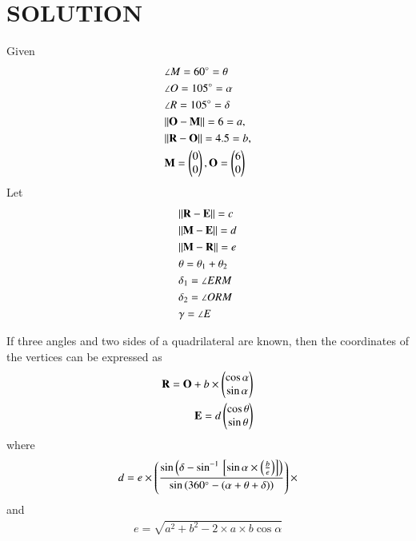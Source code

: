 \documentclass[journal,12pt,twocolumn]{IEEEtran}
\begin{document}
\section{SOLUTION}
Given
    \begin{align}
    &\angle M= 60\degree=\theta \label{eq1}
    \\
    &\angle O= 105\degree=\alpha
    \\
    &\angle R= 105\degree=\delta \label{eq2}
    \\
    &\lVert\mathbf{O}-\mathbf{M}\rVert =6=a, \label{eq3}
    \\
    &\lVert\mathbf{R}-\mathbf{O}\rVert =4.5=b,\label{eq4}
    \\
    &\mathbf{M}=\begin{pmatrix}0\\0\end{pmatrix}, \mathbf{O}=\begin{pmatrix}6\\0\end{pmatrix}
    \end{align}
      Let
\begin{align}
 &\lVert\mathbf{R}-\mathbf{E}\rVert=c
 \\
  &\lVert\mathbf{M}-\mathbf{E}\rVert =d 
  \\
    &\lVert\mathbf{M}-\mathbf{R}\rVert =e
  \\
  &\theta= \theta_1 + \theta_2
  \\
  & \delta_1=\angle ERM \\
  & \delta_2= \angle ORM\\
  & \gamma= \angle E
\end{align}
\begin{lemma}
If three angles and two sides of a quadrilateral are known, then the coordinates of the vertices can be expressed as
\begin{align}
    \mathbf{R}=\mathbf{O}+b\times \begin{pmatrix}\cos \alpha \\ \sin \alpha\end{pmatrix}\\
    \mathbf{E}=d \begin{pmatrix}\cos \theta \\ \sin \theta\end{pmatrix}
\end{align}
where 
\begin{align}
    d=e \times \left(\frac{\sin\left({\delta-\sin^{-1}{}\left[\sin{\alpha}\times \left(\frac{b}{e}\right)\right]}\right)}{\sin\left({360\degree-(\alpha+\theta+\delta)}\right)}\right)
\times
\end{align}
and
\begin{align}
    e=\sqrt{a^2+b^2-2\times a \times b\cos{\alpha}}
\end{align}
\end{lemma}
\end{document}
